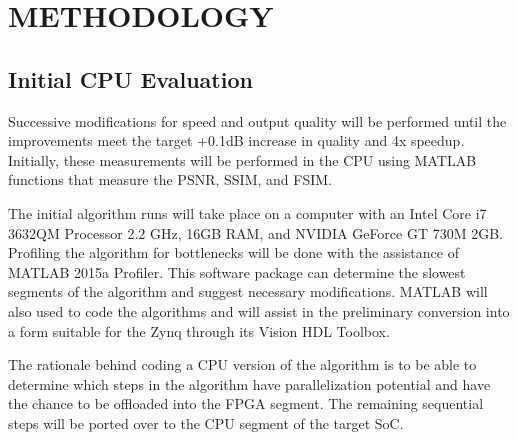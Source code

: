 
\chapter{METHODOLOGY} %

\label{Chapter4} %





\section{Initial CPU Evaluation}

Successive modifications for speed and output quality will be performed until the improvements meet the target +0.1dB increase in quality and 4x speedup.
Initially, these measurements will be performed in the CPU using MATLAB functions that measure the PSNR, SSIM, and FSIM.

The initial algorithm runs will take place on a computer with an Intel Core i7 3632QM Processor 2.2 GHz, 16GB RAM, and NVIDIA GeForce GT 730M 2GB. 
Profiling the algorithm for bottlenecks will be done with the assistance of MATLAB 2015a Profiler. 
This software package can determine the slowest segments of the algorithm and suggest necessary modifications.
MATLAB will also used to code the algorithms and will assist in the preliminary conversion into a form suitable for the Zynq through its Vision HDL Toolbox.

The rationale behind coding a CPU version of the algorithm is to be able to determine which steps in the algorithm have parallelization potential and have the chance to be offloaded into the FPGA segment. 
The remaining sequential steps will be ported over to the CPU segment of the target SoC.

